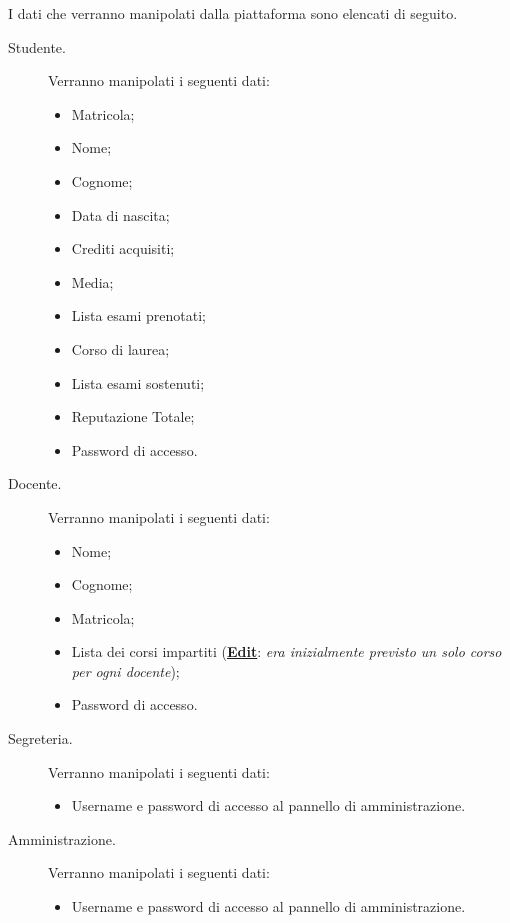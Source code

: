 \documentclass [a4paper,11pt]{book}
\begin{document}
I dati che verranno manipolati dalla piattaforma sono elencati di seguito.
\begin{description}
\item[Studente.] Verranno manipolati i seguenti dati:

\begin{itemize}
\item Matricola;
\item Nome;
\item Cognome;
\item Data di nascita;
\item Crediti acquisiti;
\item Media;
\item Lista esami prenotati; 
\item Corso di laurea;
\item Lista esami sostenuti;
\item Reputazione Totale;
\item Password di accesso.
\end{itemize}

\item[Docente.] Verranno manipolati i seguenti dati:

\begin{itemize}
\item Nome;
\item Cognome;
\item Matricola;
\item Lista dei corsi impartiti (\textbf{\underline{Edit}}: \emph{era inizialmente previsto un solo corso per ogni docente});
\item Password di accesso.
\end{itemize}

\item[Segreteria.] Verranno manipolati i seguenti dati:
\begin{itemize}
\item Username e password di accesso al pannello di amministrazione.
\end{itemize}

\item[Amministrazione.] Verranno manipolati i seguenti dati:
\begin{itemize}
\item Username e password di accesso al pannello di amministrazione.
\end{itemize}

\end{description}

\medskip
\medskip
\end{document}
